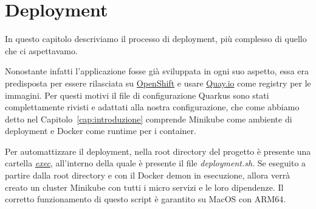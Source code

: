\chapter{Deployment}
In questo capitolo descriviamo il processo di deployment, più complesso di quello che ci aspettavamo.

Nonostante infatti l'applicazione fosse già sviluppata in ogni suo aspetto, essa era predisposta per essere rilasciata su \href{https://www.redhat.com/en/technologies/cloud-computing/openshift}{OpenShift} e usare \href{https://quay.io}{Quay.io} come registry per le immagini. Per questi motivi il file di configurazione Quarkus sono stati complettamente rivisti e adattati alla nostra configurazione, che come abbiamo detto nel Capitolo~\ref{cap:introduzione} comprende Minikube come ambiente di deployment e Docker come runtime per i container.

\myskip

Per automattizzare il deployment, nella root directory del progetto è presente una cartella \href{https://github.com/edoardosarri24/quarkus-car-rental/tree/master/exec}{\textit{exec}}, all'interno della quale è presente il file \textit{deployment.sh}. Se eseguito a partire dalla root directory e con il Docker demon in esecuzione, allora verrà creato un cluster Minikube con tutti i micro servizi e le loro dipendenze. Il corretto funzionamento di questo script è garantito su MacOS con ARM64.

